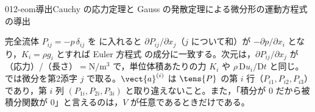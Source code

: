 \documentclass[uplatex,dvipdfmx,a4paper,11pt]{jsarticle}
\begin{document}
\begin{mondai}{012-eom}{導出}{Cauchy の応力定理と Gauss の発散定理による微分形の運動方程式の導出}
\begin{tadashii}
\kenzan 完全流体 $P_{ij}=-p\,\delta_{ij}$ を  に入れると $\partial P_{ij}/\partial x_j$（$j$ について和）が $-\partial p/\partial x_i$ となり，$K_i=\rho g_i$ とすれば Euler 方程式  の成分に一致する。次元は，$\partial P_{ij}/\partial x_j$ が（応力）/（長さ）$=\unit{\newton\per\metre\cubed}$ で，単位体積あたりの力 $K_i$ や $\rho\,\mathrm{D}u_i/\mathrm{D}t$ と同じ。
\tsumazuki {} では微分を第2添字 $j$ で取る。$\vect{a}^{(i)}$ は $\tens{P}$ の第 $i$ 行（$P_{i1},P_{i2},P_{i3}$）であり，第 $i$ 列 $(P_{1i},P_{2i},P_{3i})$ と取り違えないこと。また，「積分が $0$ だから被積分関数が $0$」と言えるのは，$V$ が任意であるときだけである。
\end{tadashii}
\end{mondai}

\end{document}
